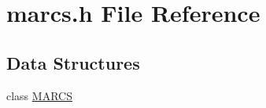 \hypertarget{a00029}{\section{marcs.\-h File Reference}
\label{a00029}
}
\subsection*{Data Structures}
\begin{DoxyCompactItemize}
\item 
class \hyperlink{a00008}{M\-A\-R\-C\-S}
\end{DoxyCompactItemize}
